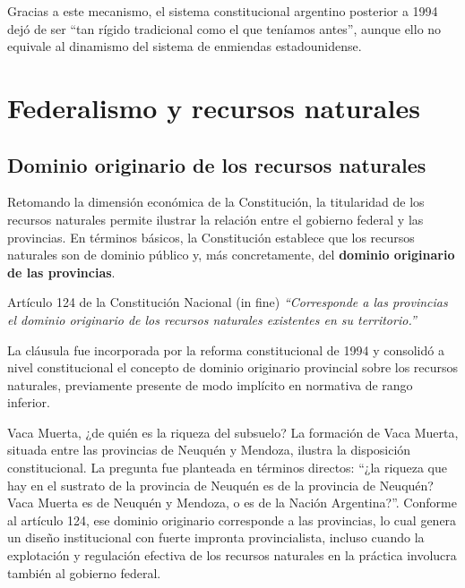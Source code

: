 \documentclass[12pt,oneside]{book}
\begin{document}
Gracias a este mecanismo, el sistema constitucional argentino posterior a 1994 dejó de ser ``tan rígido tradicional como el que teníamos antes'', aunque ello no equivale al dinamismo del sistema de enmiendas estadounidense.

\chapter[Federalismo y recursos naturales]{Federalismo y recursos naturales}

\section{Dominio originario de los recursos naturales}

Retomando la dimensión económica de la Constitución, la titularidad de los recursos naturales permite ilustrar la relación entre el gobierno federal y las provincias. En términos básicos, la Constitución establece que los recursos naturales son de dominio público y, más concretamente, del \textbf{dominio originario de las provincias}.

\begin{norma}{Artículo 124 de la Constitución Nacional (in fine)}
\textit{``Corresponde a las provincias el dominio originario de los recursos naturales existentes en su territorio.''}

\medskip
La cláusula fue incorporada por la reforma constitucional de 1994 y consolidó a nivel constitucional el concepto de dominio originario provincial sobre los recursos naturales, previamente presente de modo implícito en normativa de rango inferior.
\end{norma}

\begin{example}{Vaca Muerta, ¿de quién es la riqueza del subsuelo?}
La formación de Vaca Muerta, situada entre las provincias de Neuquén y Mendoza, ilustra la disposición constitucional. La pregunta fue planteada en términos directos: ``¿la riqueza que hay en el sustrato de la provincia de Neuquén es de la provincia de Neuquén? Vaca Muerta es de Neuquén y Mendoza, o es de la Nación Argentina?''. Conforme al artículo 124, ese dominio originario corresponde a las provincias, lo cual genera un diseño institucional con fuerte impronta provincialista, incluso cuando la explotación y regulación efectiva de los recursos naturales en la práctica involucra también al gobierno federal.
\end{example}
\end{document}
